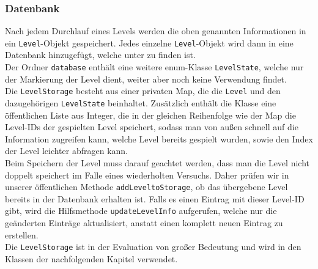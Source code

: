 \subsubsection{Datenbank}
Nach jedem Durchlauf eines Levels werden die oben genannten Informationen in ein \texttt{Level}-Objekt gespeichert. Jedes einzelne \texttt{Level}-Objekt wird dann in eine Datenbank hinzugefügt, welche unter  zu finden ist. \\
Der Ordner \texttt{database} enthält eine weitere enum-Klasse \texttt{LevelState}, welche nur der Markierung der Level dient, weiter aber noch keine Verwendung findet. \\ 
Die \texttt{LevelStorage} besteht aus einer privaten Map, die die \texttt{Level} und den dazugehörigen \texttt{LevelState} beinhaltet. Zusätzlich enthält die Klasse eine öffentlichen Liste aus Integer, die in der gleichen Reihenfolge wie der Map die Level-IDs der gespielten Level speichert, sodass man von außen schnell auf die Information zugreifen kann, welche Level bereits gespielt wurden, sowie den Index der Level leichter abfragen kann. \\
Beim Speichern der Level muss darauf geachtet werden, dass man die Level nicht doppelt speichert im Falle eines wiederholten Versuchs. Daher prüfen wir in unserer öffentlichen Methode \texttt{addLeveltoStorage}, ob das übergebene Level bereits in der Datenbank erhalten ist. Falls es einen Eintrag mit dieser Level-ID gibt, wird die Hilfsmethode \texttt{updateLevelInfo} aufgerufen, welche nur die geänderten Einträge aktualisiert, anstatt einen komplett neuen Eintrag zu erstellen. \\
Die \texttt{LevelStorage} ist in der Evaluation von großer Bedeutung und wird in den Klassen der nachfolgenden Kapitel verwendet.

